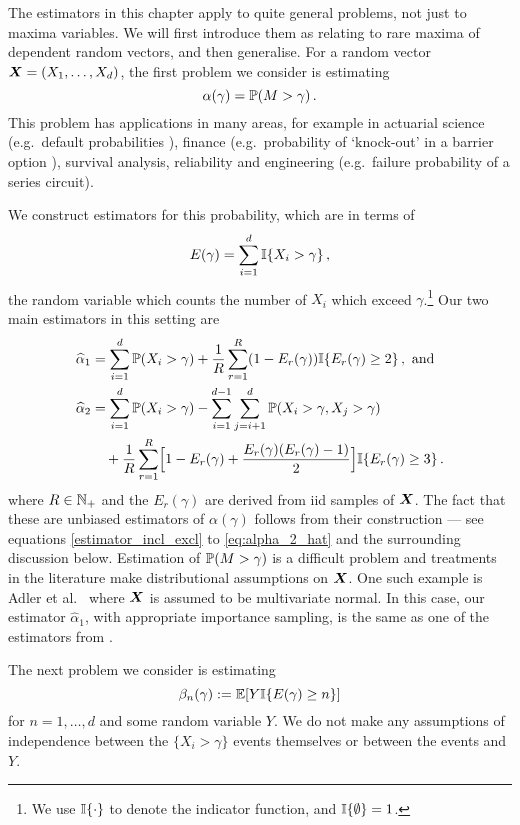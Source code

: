 The estimators in this chapter apply to quite general problems, not just to maxima variables. We will first introduce them as relating to rare maxima of dependent random vectors, and then generalise.
For a random vector $\bm{X} = (X_1, \dots, X_d)$, the first problem we consider is estimating
\[ \alpha(\gamma) = \operatorname{{\mathbb P}}(M > \gamma) \,. \]
This problem has applications in many areas, for example in actuarial science (e.g.\ default probabilities \cite{asmussen2010ruin}), finance (e.g.\ probability of `knock-out' in a barrier option \cite{cont2010encyclopedia}), survival analysis, reliability \cite{rausand2004system} and engineering (e.g.\ failure probability of a series circuit).

We construct estimators for this probability, which are in terms of
\[ E(\gamma) = \sum_{i=1}^d \mathbb{I}\{ X_i > \gamma \} \,,\]
the random variable which counts the number of $X_i$ which exceed $\gamma$.\footnote{We use $\mathbb{I}\{ \cdot \}$ to denote the indicator function, and $\mathbb{I}\{ \emptyset \} = 1$.} Our two main estimators in this setting are %
\begin{align}
  \widehat{\alpha}_1 \label{alpha_1}
  &= \sum_{i=1}^d \operatorname{{\mathbb P}}(X_i > \gamma) + \frac1R \sum_{r=1}^R (1 - E_r(\gamma)) \mathbb{I}\{ E_r(\gamma) \ge 2  \} \,, \text{ and} \\
  \widehat{\alpha}_2  \label{alpha_2}
  &= \sum_{i=1}^d \operatorname{{\mathbb P}}(X_i > \gamma) - \sum_{i=1}^{d-1} \sum_{j=i+1}^d \operatorname{{\mathbb P}}(X_i > \gamma, X_j > \gamma) \notag \\
  &\quad + \frac1R \sum_{r=1}^R \Bigl[1 - E_r(\gamma) + \frac{E_r(\gamma) (E_r(\gamma) -1)}{2} \Bigr] \mathbb{I}\{ E_r(\gamma) \ge 3 \} \,.
\end{align}
where $R \in \mathbb{N}_+$ and the $E_r(\gamma)$ are derived from iid samples of $\bm{X}$.
The fact that these are unbiased estimators of $\alpha(\gamma)$ follows from their construction --- see equations \eqref{estimator_incl_excl} to \eqref{eq:alpha_2_hat} and the surrounding discussion below. Estimation of
$\operatorname{{\mathbb P}}(M > \gamma)$ is a difficult problem and treatments in the literature make distributional assumptions on $\bm{X}$.
 One such example is Adler et al.\ \cite{adler2012efficient} where $\bm{X}$ is assumed to be multivariate normal. In this case, our estimator $\hat{\alpha}_1$, with appropriate importance sampling, is the same as one of the estimators from \cite{adler2012efficient}.

The next problem we consider is estimating
\[ \beta_n(\gamma) := \operatorname{{\mathbb E}}[ Y \mathbb{I}\{  E(\gamma) \ge n \} ] \]
for $n=1,\dots,d$ and some random variable $Y$.
We do not make any assumptions of independence between the $\{X_i > \gamma\}$ events themselves or between the events and $Y$.

